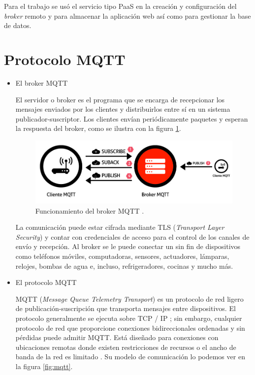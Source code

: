 
Para el trabajo se usó el servicio tipo PaaS en la creación y configuración del \emph{broker} remoto y para almacenar la aplicación web así como para gestionar la base de datos.

\section{Protocolo MQTT}

\begin{itemize}
\item El broker MQTT

El servidor o broker es el programa que se encarga de recepcionar los mensajes enviados por los clientes y distribuirlos entre sí en un sistema publicador-suscriptor. Los clientes envían periódicamente paquetes y esperan la respuesta del broker, como se ilustra con la figura \ref{fig:broker}. 

\begin{figure}[htbp]
	\centering
	\includegraphics[width=.7\textwidth]{./Figures/broker.jpg}
	\caption{Funcionamiento del broker MQTT \protect\footnotemark.}

	\label{fig:broker}
\end{figure}


La comunicación puede estar cifrada mediante TLS (\emph{Transport Layer Security}) y contar con credenciales de acceso para el control de los canales de envío y recepción. Al broker se le puede conectar un sin fin de dispositivos como teléfonos móviles, computadoras, sensores, actuadores, lámparas, relojes, bombas de agua e, incluso, refrigeradores, cocinas y mucho más. 

\vspace{1cm}
\item El protocolo MQTT

MQTT (\textit{Message Queue Telemetry Transport}) es un protocolo de red ligero de publicación-suscripción que transporta mensajes entre dispositivos. El protocolo generalmente se ejecuta sobre TCP / IP ; sin embargo, cualquier protocolo de red que proporcione conexiones bidireccionales ordenadas y sin pérdidas puede admitir MQTT. Está diseñado para conexiones con ubicaciones remotas donde existen restricciones de recursos o el ancho de banda de la red es limitado \citep{WEBSITE:3}. Su modelo de comunicación lo podemos ver en la figura \ref{fig:mqtt}.


\end{itemize}
